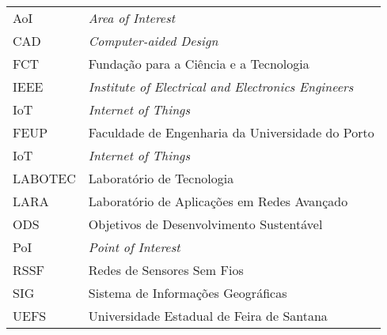 \begin{thesisabbreviations}
\begin{footnotesize}
\begin{longtable}[l]{p{2cm}l}

    AoI     \dotfill & \textit{Area of Interest} \\
    CAD     \dotfill & \textit{Computer-aided Design} \\
    FCT     \dotfill & Fundação para a Ciência e a Tecnologia \\
    IEEE    \dotfill & \textit{Institute of Electrical and Electronics Engineers} \\
    IoT     \dotfill & \textit{Internet of Things} \\
    FEUP    \dotfill & Faculdade de Engenharia da Universidade do Porto \\
    IoT     \dotfill & \textit{Internet of Things} \\
    LABOTEC \dotfill & Laboratório de Tecnologia \\
    LARA    \dotfill & Laboratório de Aplicações em Redes Avançado \\
    ODS     \dotfill & Objetivos de Desenvolvimento Sustentável \\
    PoI     \dotfill & \textit{Point of Interest} \\
    RSSF    \dotfill & Redes de Sensores Sem Fios \\
    SIG     \dotfill & Sistema de Informações Geográficas \\
    UEFS    \dotfill & Universidade Estadual de Feira de Santana \\

\end{longtable}
\end{footnotesize}
\end{thesisabbreviations}
